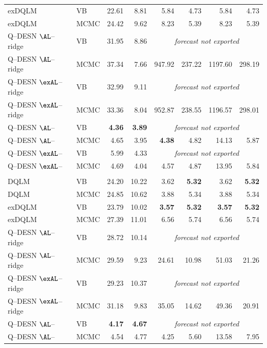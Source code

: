 \begin{table}[H]
\begin{tabular}{@{}llrrrrrr@{}}
exDQLM & VB & 22.61 & 8.81 & 5.84 & 4.73 & 5.84 & 4.73 \\
exDQLM & MCMC & 24.42 & 9.62 & 8.23 & 5.39 & 8.23 & 5.39 \\
Q--DESN \(\AL\)--ridge & VB & 31.95 & 8.86 & \multicolumn{4}{c}{\emph{forecast not exported}} \\
Q--DESN \(\AL\)--ridge & MCMC & 37.34 & 7.66 & 947.92 & 237.22 & 1197.60 & 298.19 \\
Q--DESN \(\exAL\)--ridge & VB & 32.99 & 9.11 & \multicolumn{4}{c}{\emph{forecast not exported}} \\
Q--DESN \(\exAL\)--ridge & MCMC & 33.36 & 8.04 & 952.87 & 238.55 & 1196.57 & 298.01 \\
Q--DESN \(\AL\)--\RHS{} & VB & \textbf{4.36} & \textbf{3.89} & \multicolumn{4}{c}{\emph{forecast not exported}} \\
Q--DESN \(\AL\)--\RHS{} & MCMC & 4.65 & 3.95 & \textbf{4.38} & 4.82 & 14.13 & 5.87 \\
Q--DESN \(\exAL\)--\RHS{} & VB & 5.99 & 4.33 & \multicolumn{4}{c}{\emph{forecast not exported}} \\
Q--DESN \(\exAL\)--\RHS{} & MCMC & 4.69 & 4.04 & 4.57 & 4.87 & 13.95 & 5.84 \\
\addlinespace[0.25em]
\multicolumn{8}{@{}l}{\emph{$\tau = 0.50$}}\\
DQLM & VB & 24.20 & 10.22 & 3.62 & \textbf{5.32} & 3.62 & \textbf{5.32} \\
DQLM & MCMC & 24.85 & 10.62 & 3.88 & 5.34 & 3.88 & 5.34 \\
exDQLM & VB & 23.79 & 10.02 & \textbf{3.57} & \textbf{5.32} & \textbf{3.57} & \textbf{5.32} \\
exDQLM & MCMC & 27.39 & 11.01 & 6.56 & 5.74 & 6.56 & 5.74 \\
Q--DESN \(\AL\)--ridge & VB & 28.72 & 10.14 & \multicolumn{4}{c}{\emph{forecast not exported}} \\
Q--DESN \(\AL\)--ridge & MCMC & 29.59 & 9.23 & 24.61 & 10.98 & 51.03 & 21.26 \\
Q--DESN \(\exAL\)--ridge & VB & 29.23 & 10.37 & \multicolumn{4}{c}{\emph{forecast not exported}} \\
Q--DESN \(\exAL\)--ridge & MCMC & 31.18 & 9.83 & 35.05 & 14.62 & 49.36 & 20.91 \\
Q--DESN \(\AL\)--\RHS{} & VB & \textbf{4.17} & \textbf{4.67} & \multicolumn{4}{c}{\emph{forecast not exported}} \\
Q--DESN \(\AL\)--\RHS{} & MCMC & 4.54 & 4.77 & 4.25 & 5.60 & 13.58 & 7.95 \\

\end{tabular}
\end{table}
